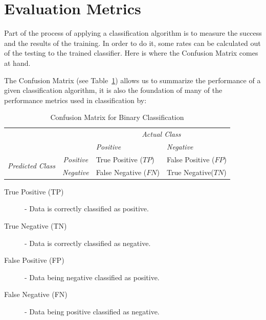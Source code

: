 \section{Evaluation Metrics}\label{sec:ev-metrics}

Part of the process of applying a classification algorithm is to measure the 
success and the results of the training. In order to do it, some rates can be 
calculated out of the testing to the trained classifier. Here is where the 
Confusion Matrix comes at hand.

The Confusion Matrix (see Table~\ref{tab:conf-matrix}) allows us to summarize 
the performance of a given classification algorithm, it is also the foundation 
of many of the performance metrics used in classification by:

\begin{table}[h!]
\centering
\footnotesize
\caption{Confusion Matrix for Binary Classification}
\label{tab:conf-matrix}
\begin{tabular}{c c | p{2.5cm} | p{2.5cm} }
  & & \multicolumn{2}{c}{\emph{Actual Class}}\\
  & &    \emph{Positive} & \emph{Negative} \\
  \hline
  \multirow{4}{*}{\emph{Predicted Class}}
  &\emph{Positive} & True Positive \newline ($TP$) & False Positive \newline ($FP$)\\
  \cline{2-4}
  &\emph{Negative} & False Negative \newline ($FN$) & True Negative\newline ($TN$)\\
\end{tabular}
\end{table}

\begin{description}
 \item [True Positive (TP)] - Data is correctly classified as positive.
 \item [True Negative (TN)] - Data is correctly classified as negative.
 \item [False Positive (FP)] - Data being negative classified as positive.
 \item [False Negative (FN)] - Data being positive classified as negative. 
\end{description} 

